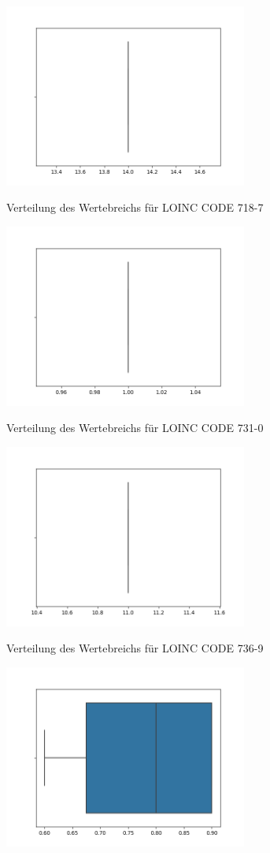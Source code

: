 \documentclass[12pt,a4paper,toc=bibliographynumbered,toc=indenttextentries]{scrreprt}
\begin{document}
\begin{center}
			\includegraphics[width=8cm]{Graphs/718-7.png}
			
			\small{Verteilung des Wertebreichs für LOINC CODE 718-7}
			
			\includegraphics[width=8cm]{Graphs/731-0.png}
			
			\small{Verteilung des Wertebreichs für LOINC CODE 731-0}
			
			\includegraphics[width=8cm]{Graphs/736-9.png}
			
			\small{Verteilung des Wertebreichs für LOINC CODE 736-9}
			
			\includegraphics[width=8cm]{Graphs/742-7.png}
			

\end{center}
\end{document}
